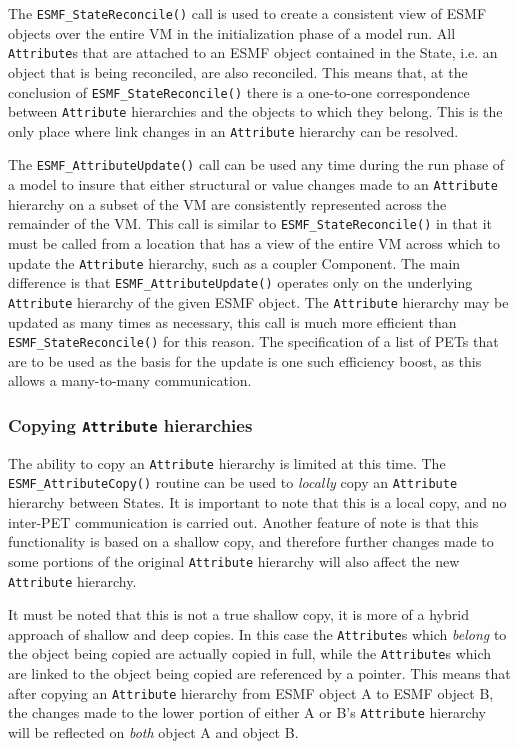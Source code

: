 The {\tt ESMF\_StateReconcile()} call is used to create a consistent view of ESMF objects over the entire VM in the initialization phase of a model run.  All {\tt Attribute}s that are attached to an ESMF object contained in the State, i.e. an object that is being reconciled, are also reconciled.  This means that, at the conclusion of {\tt ESMF\_StateReconcile()} there is a one-to-one correspondence between {\tt Attribute} hierarchies and the objects to which they belong.  This is the only place where link changes in an {\tt Attribute} hierarchy can be resolved.

The {\tt ESMF\_AttributeUpdate()} call can be used any time during the run phase of a model to insure that either structural or value changes made to an {\tt Attribute} hierarchy on a subset of the VM are consistently represented across the remainder of the VM.  This call is similar to {\tt ESMF\_StateReconcile()} in that it must be called from a location that has a view of the entire VM across which to update the {\tt Attribute} hierarchy, such as a coupler Component.  The main difference is that {\tt ESMF\_AttributeUpdate()} operates only on the underlying {\tt Attribute} hierarchy of the given ESMF object.  The {\tt Attribute} hierarchy may be updated as many times as necessary, this call is much more efficient than {\tt ESMF\_StateReconcile()} for this reason.  The specification of a list of PETs that are to be used as the basis for the update is one such efficiency boost, as this allows a many-to-many communication.

\subsubsection{Copying {\tt Attribute} hierarchies}

The ability to copy an {\tt Attribute} hierarchy is limited at this time.  The {\tt ESMF\_AttributeCopy()} routine can be used to {\it locally} copy an {\tt Attribute} hierarchy between States.  It is important to note that this is a local copy, and no inter-PET communication is carried out.  Another feature of note is that this functionality is based on a shallow copy, and therefore further changes made to some portions of the original {\tt Attribute} hierarchy will also affect the new {\tt Attribute} hierarchy.

It must be noted that this is not a true shallow copy, it is more of a hybrid approach of shallow and deep copies.  In this case the {\tt Attribute}s which {\it belong} to the object being copied are actually copied in full, while the {\tt Attribute}s which are linked to the object being copied are referenced by a pointer.  This means that after copying an {\tt Attribute} hierarchy from ESMF object A to ESMF object B, the changes made to the lower portion of either A or B's {\tt Attribute} hierarchy will be reflected on {\it both} object A and object B.





